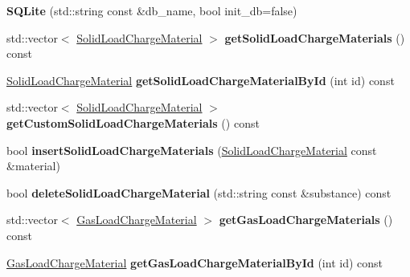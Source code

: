 \begin{DoxyCompactItemize}
\item 
\mbox{\label{class_s_q_lite_a758f334ed7e72820f4f0e83d2b707625}} 
{\bfseries S\+Q\+Lite} (std\+::string const \&db\+\_\+name, bool init\+\_\+db=false)
\item 
\mbox{\label{class_s_q_lite_a0c4fdc189a0da0d879c657b9fed5ef1b}} 
std\+::vector$<$ \hyperlink{class_solid_load_charge_material}{Solid\+Load\+Charge\+Material} $>$ {\bfseries get\+Solid\+Load\+Charge\+Materials} () const
\item 
\mbox{\label{class_s_q_lite_ab2a00b913321a96a4d7b700627195616}} 
\hyperlink{class_solid_load_charge_material}{Solid\+Load\+Charge\+Material} {\bfseries get\+Solid\+Load\+Charge\+Material\+By\+Id} (int id) const
\item 
\mbox{\label{class_s_q_lite_a74e20802e333acd20a86bfdc4013eba8}} 
std\+::vector$<$ \hyperlink{class_solid_load_charge_material}{Solid\+Load\+Charge\+Material} $>$ {\bfseries get\+Custom\+Solid\+Load\+Charge\+Materials} () const
\item 
\mbox{\label{class_s_q_lite_a5c40ac3b9a6abb85c9cfbe50802672c5}} 
bool {\bfseries insert\+Solid\+Load\+Charge\+Materials} (\hyperlink{class_solid_load_charge_material}{Solid\+Load\+Charge\+Material} const \&material)
\item 
\mbox{\label{class_s_q_lite_a87415ea66b330bc919acaaf042c8ff02}} 
bool {\bfseries delete\+Solid\+Load\+Charge\+Material} (std\+::string const \&substance) const
\item 
\mbox{\label{class_s_q_lite_a173cb741ec36f8b15e3650f6e1736b12}} 
std\+::vector$<$ \hyperlink{class_gas_load_charge_material}{Gas\+Load\+Charge\+Material} $>$ {\bfseries get\+Gas\+Load\+Charge\+Materials} () const
\item 
\mbox{\label{class_s_q_lite_ab89ac4049cbedcb6340f5d7d0139b89e}} 
\hyperlink{class_gas_load_charge_material}{Gas\+Load\+Charge\+Material} {\bfseries get\+Gas\+Load\+Charge\+Material\+By\+Id} (int id) const
\item 
\mbox{\label{class_s_q_lite_a2491f6b082059bde751dfd117f1feed6}} 

\end{DoxyCompactItemize}
